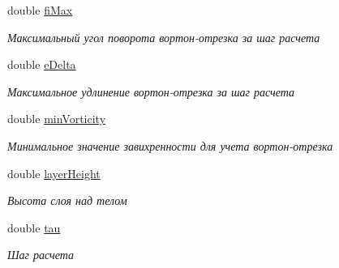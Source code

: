 \begin{DoxyCompactItemize}
\mbox{\label{struct_solver_parameters_a52393837c4d3fb1bf1900140421d2c3c}} 
double \mbox{\hyperlink{struct_solver_parameters_a52393837c4d3fb1bf1900140421d2c3c}{fi\+Max}}
\begin{DoxyCompactList}\small\item\em Максимальный угол поворота вортон-\/отрезка за шаг расчета \end{DoxyCompactList}\item 
\mbox{\label{struct_solver_parameters_a77535a5d16a3d67d1b6f629dcab51168}} 
double \mbox{\hyperlink{struct_solver_parameters_a77535a5d16a3d67d1b6f629dcab51168}{e\+Delta}}
\begin{DoxyCompactList}\small\item\em Максимальное удлинение вортон-\/отрезка за шаг расчета \end{DoxyCompactList}\item 
\mbox{\label{struct_solver_parameters_af3786bbca8c4174bcdaa600c0c16c512}} 
double \mbox{\hyperlink{struct_solver_parameters_af3786bbca8c4174bcdaa600c0c16c512}{min\+Vorticity}}
\begin{DoxyCompactList}\small\item\em Минимальное значение завихренности для учета вортон-\/отрезка \end{DoxyCompactList}\item 
\mbox{\label{struct_solver_parameters_a2312895133b536438ee403b45eac1f39}} 
double \mbox{\hyperlink{struct_solver_parameters_a2312895133b536438ee403b45eac1f39}{layer\+Height}}
\begin{DoxyCompactList}\small\item\em Высота слоя над телом \end{DoxyCompactList}\item 
\mbox{\label{struct_solver_parameters_abdb86396d6353ec392ca2240e9db469e}} 
double \mbox{\hyperlink{struct_solver_parameters_abdb86396d6353ec392ca2240e9db469e}{tau}}
\begin{DoxyCompactList}\small\item\em Шаг расчета \end{DoxyCompactList}\item 
\mbox{\label{struct_solver_parameters_ae7ed64ac6fb80155e47866f497196283}} 

\end{DoxyCompactItemize}
